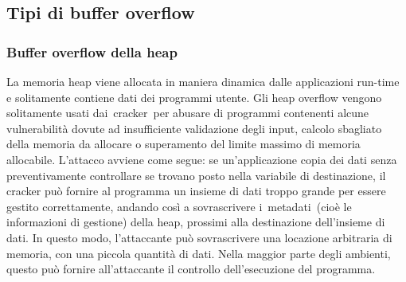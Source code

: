 \documentclass[8pt]{extarticle}
\begin{document}
\subsection{Tipi di buffer overflow}
\subsubsection{Buffer overflow della heap}
La memoria heap viene allocata in maniera dinamica dalle applicazioni run-time e solitamente contiene 
dati dei programmi utente. Gli heap overflow vengono solitamente usati dai cracker per abusare di 
programmi contenenti alcune vulnerabilità dovute ad insufficiente validazione degli input, calcolo 
sbagliato della memoria da allocare o superamento del limite massimo di memoria allocabile. 
L'attacco avviene come segue: se un'applicazione copia dei dati senza preventivamente controllare 
se trovano posto nella variabile di destinazione, il cracker può fornire al programma un insieme di 
dati troppo grande per essere gestito correttamente, andando così a sovrascrivere i metadati (cioè le 
informazioni di gestione) della heap, prossimi alla destinazione dell'insieme di dati. In questo modo, 
l'attaccante può sovrascrivere una locazione arbitraria di memoria, con una piccola quantità di dati. 
Nella maggior parte degli ambienti, questo può fornire all'attaccante il controllo dell'esecuzione del 
programma. 
\end{document}
